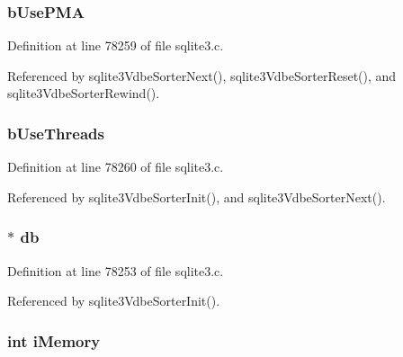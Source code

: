 \subsubsection[{b\+Use\+P\+M\+A}]{ b\+Use\+P\+M\+A}\label{struct_vdbe_sorter_ab5160dba26e99bef22a9244cd277ffad}


Definition at line 78259 of file sqlite3.\+c.



Referenced by sqlite3\+Vdbe\+Sorter\+Next(), sqlite3\+Vdbe\+Sorter\+Reset(), and sqlite3\+Vdbe\+Sorter\+Rewind().

\hypertarget{struct_vdbe_sorter_a57cf86dcc60eea39f93b5da24d777897}{}
\subsubsection[{b\+Use\+Threads}]{ b\+Use\+Threads}\label{struct_vdbe_sorter_a57cf86dcc60eea39f93b5da24d777897}


Definition at line 78260 of file sqlite3.\+c.



Referenced by sqlite3\+Vdbe\+Sorter\+Init(), and sqlite3\+Vdbe\+Sorter\+Next().

\hypertarget{struct_vdbe_sorter_ad6e663497d2c934364b3bcf07496b30b}{}
\subsubsection[{db}]{$\ast$ db}\label{struct_vdbe_sorter_ad6e663497d2c934364b3bcf07496b30b}


Definition at line 78253 of file sqlite3.\+c.



Referenced by sqlite3\+Vdbe\+Sorter\+Init().

\hypertarget{struct_vdbe_sorter_ab87539ef411d9bf1c22e417fbeddc961}{}
\subsubsection[{i\+Memory}]{\setlength{\rightskip}{0pt plus 5cm}int i\+Memory}\label{struct_vdbe_sorter_ab87539ef411d9bf1c22e417fbeddc961}



